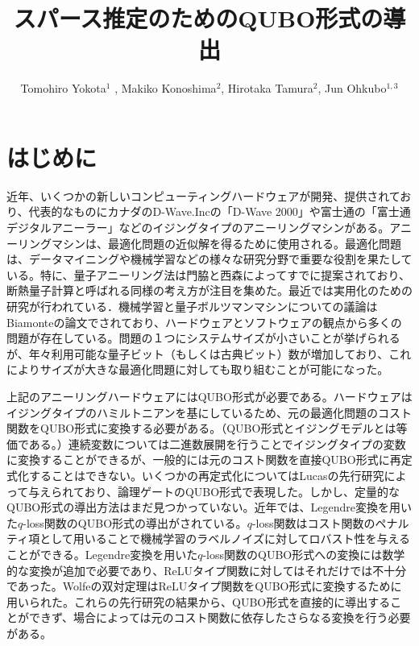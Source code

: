 \documentclass[fp,twocolumn]{jpsj3}
\title{スパース推定のためのQUBO形式の導出}
\author{Tomohiro Yokota$^1$%
  , Makiko Konoshima$^2$, Hirotaka Tamura$^2$, Jun Ohkubo$^{1,3}$}
\begin{document}
\maketitle

\section{はじめに}
近年、いくつかの新しいコンピューティングハードウェアが開発、提供されており、代表的なものにカナダのD-Wave.Incの「D-Wave 2000」や富士通の「富士通デジタルアニーラー」などのイジングタイプのアニーリングマシンがある。アニーリングマシンは、最適化問題の近似解を得るために使用される。最適化問題は、データマイニングや機械学習などの様々な研究分野で重要な役割を果たしている。特に、量子アニーリング法は門脇と西森によってすでに提案されており、断熱量子計算と呼ばれる同様の考え方が注目を集めた。最近では実用化のための研究が行われている．機械学習と量子ボルツマンマシンについての議論はBiamonteの論文でされており、ハードウェアとソフトウェアの観点から多くの問題が存在している。問題の１つにシステムサイズが小さいことが挙げられるが、年々利用可能な量子ビット（もしくは古典ビット）数が増加しており、これによりサイズが大きな最適化問題に対しても取り組むことが可能になった。

上記のアニーリングハードウェアにはQUBO形式が必要である。ハードウェアはイジングタイプのハミルトニアンを基にしているため、元の最適化問題のコスト関数をQUBO形式に変換する必要がある。（QUBO形式とイジングモデルとは等価である。）連続変数については二進数展開を行うことでイジングタイプの変数に変換することができるが、一般的には元のコスト関数を直接QUBO形式に再定式化することはできない。いくつかの再定式化についてはLucasの先行研究によって与えられており、論理ゲートのQUBO形式で表現した。しかし、定量的なQUBO形式の導出方法はまだ見つかっていない。近年では、Legendre変換を用いた$q$-loss関数のQUBO形式の導出がされている。$q$-loss関数はコスト関数のペナルティ項として用いることで機械学習のラベルノイズに対してロバスト性を与えることができる。Legendre変換を用いた$q$-loss関数のQUBO形式への変換には数学的な変換が追加で必要であり、ReLUタイプ関数に対してはそれだけでは不十分であった。Wolfeの双対定理はReLUタイプ関数をQUBO形式に変換するために用いられた。これらの先行研究の結果から、QUBO形式を直接的に導出することができず、場合によっては元のコスト関数に依存したさらなる変換を行う必要がある。
\end{document}
